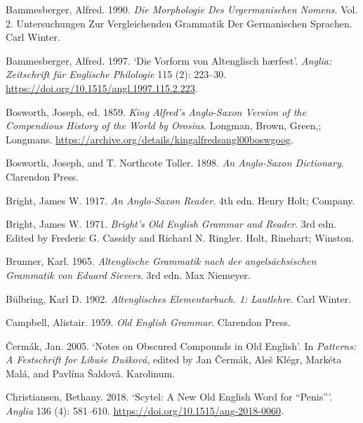 \documentclass[
  british,
  a4paper,
]{article}
\newlength{\cslhangindent}
\newenvironment{CSLReferences}[2] %
 {\begin{list}{}{%
  \setlength{\itemindent}{0pt}
  \setlength{\leftmargin}{0pt}
  \setlength{\parsep}{0pt}
  \ifodd #1
   \setlength{\leftmargin}{\cslhangindent}
   \setlength{\itemindent}{-1\cslhangindent}
  \fi
  \setlength{\itemsep}{#2\baselineskip}}}
 {\end{list}}
\begin{document}
\protect{}\label{refs}
\begin{CSLReferences}{1}{1}
Bammesberger, Alfred. 1990. \emph{Die Morphologie Des Urgermanischen
Nomens}. Vol. 2. Untersuchungen Zur Vergleichenden Grammatik Der
Germanischen Sprachen. Carl Winter.

Bammesberger, Alfred. 1997. {`Die Vorform von Altenglisch {h{æ}rfest}'}.
\emph{Anglia: Zeitschrift f{ü}r Englische Philologie} 115 (2): 223--30.
\url{https://doi.org/10.1515/angl.1997.115.2.223}.

Bosworth, Joseph, ed. 1859. \emph{King {Alfred}'s {Anglo-Saxon} Version
of the Compendious History of the World by {Orosius}}. Longman, Brown,
Green,; Longmans.
\url{https://archive.org/details/kingalfredsangl00boswgoog}.

Bosworth, Joseph, and T. Northcote Toller. 1898. \emph{An {Anglo-Saxon}
Dictionary}. Clarendon Press.

Bright, James W. 1917. \emph{An Anglo-Saxon Reader}. 4th edn. Henry
Holt; Company.

Bright, James W. 1971. \emph{Bright's {Old English} Grammar and Reader}.
3rd edn. Edited by Frederic G. Cassidy and Richard N. Ringler. Holt,
Rinehart; Winston.

Brunner, Karl. 1965. \emph{{Altenglische Grammatik nach der
angels{ä}chsischen Grammatik von Eduard Sievers}}. 3rd edn. Max
Niemeyer.

Bülbring, Karl D. 1902. \emph{Altenglisches Elementarbuch. 1:
Lautlehre}. Carl Winter.

Campbell, Alistair. 1959. \emph{Old {English} Grammar}. Clarendon Press.

Čermák, Jan. 2005. {`Notes on Obscured Compounds in {Old English}'}. In
\emph{Patterns: A Festschrift for {Libuše Dušková}}, edited by Jan
Čermák, Aleš Klégr, Markéta Malá, and Pavlína Šaldová. Karolinum.

Christiansen, Bethany. 2018. {`{Scytel}: A New {Old English} Word for
{``Penis''}'}. \emph{Anglia} 136 (4): 581--610.
\url{https://doi.org/10.1515/ang-2018-0060}.


\end{CSLReferences}
\end{document}
